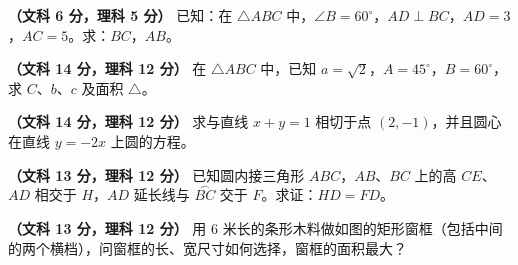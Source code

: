 \begin{question}
\textbf{（文科 6 分，理科 5 分）} 已知：在 $\triangle ABC$ 中，$\angle B=60^\circ$，$AD\perp BC$，$AD=3$，$AC=5$。求：$BC$，$AB$。
\nopagebreak[4]
\begin{center}\end{center}
\nopagebreak[4]
\Needspace{0.4\textheight}
\end{question}
\begin{question}
\textbf{（文科 14 分，理科 12 分）} 在 $\triangle ABC$ 中，已知 $a=\sqrt2$，$A=45^\circ$，$B=60^\circ$，求 $C$、$b$、$c$ 及面积 $\triangle$。
\nopagebreak[4]
\begin{center}\end{center}
\nopagebreak[4]
\end{question}
\begin{question}
\textbf{（文科 14 分，理科 12 分）} 求与直线 $x+y=1$ 相切于点 $(2,-1)$，并且圆心在直线 $y=-2x$ 上圆的方程。

\Needspace{0.4\textheight}
\end{question}
\begin{question}
\textbf{（文科 13 分，理科 12 分）} 已知圆内接三角形 $ABC$，$AB$、$BC$ 上的高 $CE$、$AD$ 相交于 $H$，$AD$ 延长线与 $\overset{\frown}{BC}$ 交于 $F$。求证：$HD=FD$。
\nopagebreak[4]
\begin{center}\end{center}
\nopagebreak[4]
\Needspace{0.4\textheight}
\end{question}
\begin{question}
\textbf{（文科 13 分，理科 12 分）} 用 $6$ 米长的条形木料做如图的矩形窗框（包括中间的两个横档），问窗框的长、宽尺寸如何选择，窗框的面积最大？
\nopagebreak[4]
\begin{center}\end{center}
\nopagebreak[4]
\Needspace{0.4\textheight}
\end{question}
